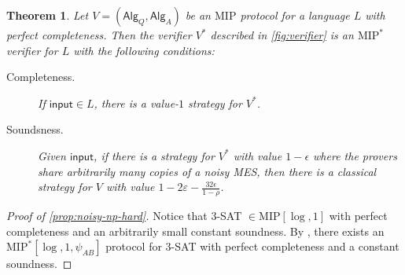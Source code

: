 \documentclass[11pt]{article}
\theoremstyle{plain}
\newtheorem{theorem}{Theorem}[section]
\theoremstyle{definition}
\newcommand{\ep} {\ensuremath{\varepsilon}}
\newcommand{\1}{\mathbb{1}} %
\newcommand{\ipt}{\mathsf{input}}
\newcommand{\Alg}{\mathsf{Alg}}
\newcommand{\MIP}{\mathrm{MIP}}
\begin{document}
\begin{theorem}\label{prop:NPC}
    Let $V= (\Alg_Q, \Alg_A)$ be an $\MIP$ protocol for a language $L$ with perfect completeness.
    Then the verifier $V^*$ described in \cref{fig:verifier} is an $\MIP^*$ verifier for $L$
    with the following conditions:
    \begin{description}
        \item[Completeness.] If $\ipt \in L$, there is a value-$1$ strategy for $V^*$.
        \item[Soundsness.] Given $\ipt$, if there is a strategy for $V^*$ with value $1-\epsilon$ where the provers share
        arbitrarily many copies of a noisy MES, then there is
        a classical strategy for $V$ with value $1 - 2\ep - \frac{32\epsilon}{1-\rho}$.
    \end{description}
\end{theorem}
\begin{proof}[Proof of \cref{prop:noisy-np-hard}]
Notice that $3$-SAT $\in \MIP[\log, 1]$ \cite{Babai1991} with perfect completeness and an arbitrarily small constant soundness. By , there exists an $\MIP^*[\log,1,\psi_{AB}]$ protocol for $3$-SAT with perfect completeness and a constant soundness. 
\end{proof}
\end{document}
